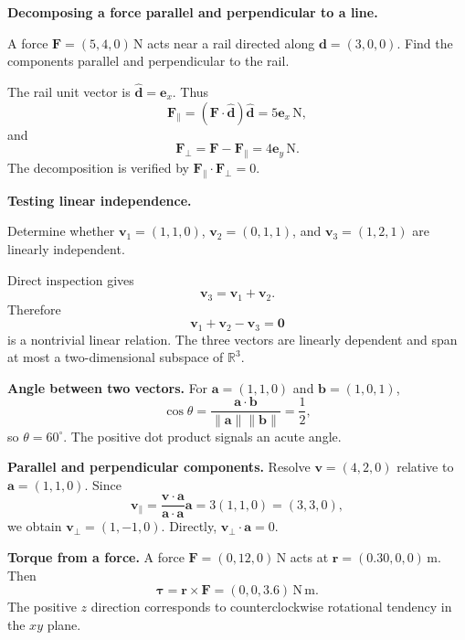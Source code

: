 \begin{workedexample}
\textbf{Decomposing a force parallel and perpendicular to a line.}

A force $\mathbf F=(5,4,0)\,\mathrm{N}$ acts near a rail directed along
$\mathbf d=(3,0,0)$. Find the components parallel and perpendicular to the rail.

\begin{solution}
The rail unit vector is $\widehat{\mathbf d}=\mathbf e_x$. Thus
\[
\mathbf F_{\parallel}
=(\mathbf F\cdot\widehat{\mathbf d})\widehat{\mathbf d}
=5\mathbf e_x\,\mathrm{N},
\]
and
\[
\mathbf F_{\perp}=\mathbf F-\mathbf F_{\parallel}
=4\mathbf e_y\,\mathrm{N}.
\]
The decomposition is verified by
$\mathbf F_{\parallel}\cdot\mathbf F_{\perp}=0$.
\end{solution}
\end{workedexample}

\begin{workedexample}
\textbf{Testing linear independence.}

Determine whether
$\mathbf v_1=(1,1,0)$, $\mathbf v_2=(0,1,1)$, and
$\mathbf v_3=(1,2,1)$ are linearly independent.

\begin{solution}
Direct inspection gives
\[
\mathbf v_3=\mathbf v_1+\mathbf v_2.
\]
Therefore
\[
\mathbf v_1+\mathbf v_2-\mathbf v_3=\mathbf 0
\]
is a nontrivial linear relation. The three vectors are linearly dependent and
span at most a two-dimensional subspace of $\mathbb R^3$.
\end{solution}
\end{workedexample}

\begin{workedexample}
\textbf{Angle between two vectors.}
For $\mathbf a=(1,1,0)$ and $\mathbf b=(1,0,1)$,
\[
\cos\theta=\frac{\mathbf a\cdot\mathbf b}{\lVert\mathbf a\rVert\lVert\mathbf b\rVert}
=\frac{1}{2},
\]
so $\theta=60^\circ$. The positive dot product signals an acute angle.
\end{workedexample}

\begin{workedexample}
\textbf{Parallel and perpendicular components.}
Resolve $\mathbf v=(4,2,0)$ relative to $\mathbf a=(1,1,0)$. Since
\[
\mathbf v_{\parallel}=\frac{\mathbf v\cdot\mathbf a}{\mathbf a\cdot\mathbf a}\mathbf a
=3(1,1,0)=(3,3,0),
\]
we obtain $\mathbf v_{\perp}=(1,-1,0)$. Directly,
$\mathbf v_{\perp}\cdot\mathbf a=0$.
\end{workedexample}

\begin{workedexample}
\textbf{Torque from a force.}
A force $\mathbf F=(0,12,0)\,\mathrm N$ acts at
$\mathbf r=(0.30,0,0)\,\mathrm m$. Then
\[
\boldsymbol\tau=\mathbf r\times\mathbf F=(0,0,3.6)\,\mathrm{N\,m}.
\]
The positive $z$ direction corresponds to counterclockwise rotational tendency in the $xy$ plane.
\end{workedexample}

